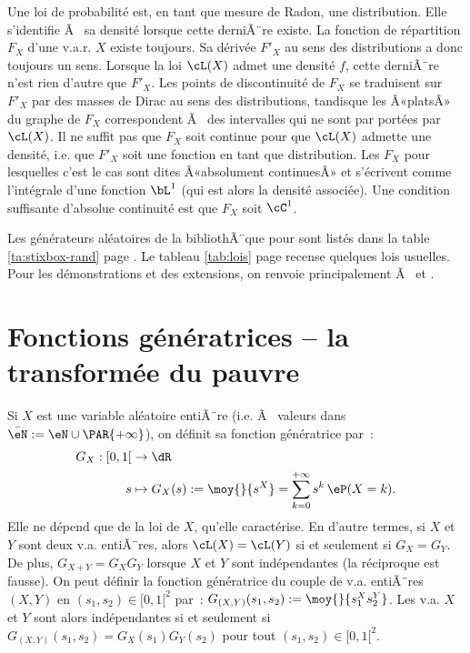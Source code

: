 {{\begin{rem}
  Une loi de probabilité est, en tant que mesure de Radon, une distribution.
  Elle s'identifie Ã  sa densité lorsque cette derniÃ¨re existe.  La fonction de
  répartition $F_X$ d'une v.a.r. $X$ existe toujours. Sa dérivée $F'_X$ au
  sens des distributions a donc toujours un sens. Lorsque la loi $\cL(X)$
  admet une densité $f$, cette derniÃ¨re n'est rien d'autre que $F'_X$.  Les
  points de discontinuité de $F_X$ se traduisent sur $F'_X$ par des masses de
  Dirac au sens des distributions, tandisque les Â«platsÂ» du graphe de $F_X$
  correspondent Ã  des intervalles qui ne sont par portées par $\cL(X)$. Il ne
  suffit pas que $F_X$ soit continue pour que $\cL(X)$ admette une densité,
  i.e. que $F'_X$ soit une fonction en tant que distribution.  Les $F_X$ pour
  lesquelles c'est le cas sont dites Â«absolument continuesÂ» et s'écrivent
  comme l'intégrale d'une fonction $\bL^1$ (qui est alors la densité
  associée). Une condition suffisante d'absolue continuité est que $F_X$ soit
  $\cC^1$.
\end{rem}

\begin{rem}
  Les générateurs aléatoires de la bibliothÃ¨que \SB{} pour \ML{} sont listés
  dans la table \ref{ta:stixbox-rand} page \pageref{ta:stixbox-rand}.  Le
  tableau \ref{tab:lois} page \pageref{tab:lois} recense quelques lois
  usuelles. Pour les démonstrations et des extensions, on renvoie
  principalement Ã  \cite{dacunha-castelle-duflo} et \cite{bouleau}.
\end{rem}

%
\section{Fonctions génératrices -- la transformée du pauvre}
%

Si $X$ est une variable aléatoire entiÃ¨re (i.e. Ã  valeurs dans
$\bar{\eN}:=\eN\cup\PAR{+\infty}$), on définit sa fonction génératrice par~:
\begin{align*}
  G_X:[0,1[ & \to\dR \\
         s & \mapsto G_X(s):=\moy{}{s^X}=\sum_{k=0}^{+\infty}s^k\,\eP(X=k).
\end{align*}
Elle ne dépend que de la loi de $X$, qu'elle caractérise.  En d'autre termes,
si $X$ et $Y$ sont deux v.a. entiÃ¨res, alors $\cL(X)=\cL(Y)$ si et seulement
si $G_X=G_Y$. De plus, $G_{X+Y}=G_X G_Y$ lorsque $X$ et $Y$ sont indépendantes
(la réciproque est fausse). On peut définir la fonction génératrice du couple
de v.a. entiÃ¨res $(X,Y)$ en $(s_1,s_2)\in[0,1[^2$ par~:
$G_{(X,Y)}(s_1,s_2):=\moy{}{s_1^Xs_2^Y}$. Les v.a. $X$ et $Y$ sont alors
indépendantes si et seulement si $G_{(X,Y)}(s_1,s_2)=G_X(s_1)G_Y(s_2)$ pour
tout $(s_1,s_2)\in[0,1[^2$.

}}

